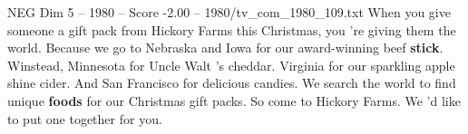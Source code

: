 \begin{textsample}{NEG Dim 5 – 1980 – Score -2.00 – 1980/tv\_com\_1980\_109.txt}  \label{ex:f5_neg_083}
When you give someone a gift pack from Hickory Farms this Christmas, you 're giving them the world.
Because we go to Nebraska and Iowa for our award-winning beef \textbf{stick}.
Winstead, Minnesota for Uncle Walt 's cheddar.
Virginia for our sparkling apple shine cider.
And San Francisco for delicious candies.
We search the world to find unique \textbf{foods} for our Christmas gift packs.
So come to Hickory Farms.
We 'd like to put one together for you.

\end{textsample}
